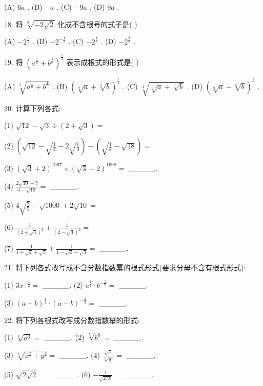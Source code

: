 \documentclass[10pt]{article}
\begin{document}
(A) \({6a}\) . (B) \(- a\) . (C) \(- {9a}\) . (D) \({9a}\) .

18. 将 \(\sqrt[3]{-2\sqrt{2}}\) 化成不含根号的式子是( )

(A) \(- {2}^{\frac{1}{2}}\) . (B) \(- {2}^{-\frac{1}{2}}\) . (C) \(- {2}^{\frac{1}{3}}\) . (D) \(- {2}^{\frac{2}{3}}\) .

19. 将 \({\left( {a}^{\frac{1}{n}} + {b}^{\frac{1}{n}}\right) }^{\frac{1}{3}}\) 表示成根式的形式是( )

(A) \(\sqrt[3]{{a}^{\frac{1}{n}} + {b}^{\frac{1}{n}}}\) . (B) \({\left( \sqrt[n]{a} + \sqrt[n]{b}\right) }^{\frac{1}{3}}\) . (C) \(\sqrt[3]{\sqrt[n]{a} + \sqrt[n]{b}}\) . (D) \({\left( \sqrt[n]{a} + \sqrt[n]{b}\right) }^{3}\) .

20. 计算下列各式:

(1) \(\sqrt{12} - \sqrt{3} \div  \left( {2 + \sqrt{3}}\right)  =\)

(2) \(\left( {\sqrt{12} - \sqrt{\frac{1}{2}} - 2\sqrt{\frac{1}{3}}}\right)  - \left( {\sqrt{\frac{1}{8}} - \sqrt{18}}\right)  =\)

(3) \({\left( \sqrt{3} + 2\right) }^{1997} \times  {\left( \sqrt{3} - 2\right) }^{1998} =\) \_\_\_\_\_.

(4) \(\frac{2\sqrt{10} - 5}{4 - \sqrt{10}} =\) \_\_\_\_\_.

(5) \(4\sqrt{\frac{2}{5}} - \sqrt{1000} + 2\sqrt{10} =\)

(6) \(\frac{1}{{\left( 2 + \sqrt{3}\right) }^{2}} + \frac{1}{{\left( 2 - \sqrt{3}\right) }^{2}} =\)

(7) \(\frac{1}{1 + \sqrt{2} + \sqrt{3}} + \frac{1}{1 - \sqrt{2} + \sqrt{3}} =\) \_\_\_\_\_.

21. 将下列各式改写成不含分数指数幂的根式形式(要求分母不含有根式形式):

(1) \(3{x}^{-\frac{3}{2}} =\) \_\_\_\_\_. (2) \({a}^{\frac{1}{2}} \cdot  {b}^{-\frac{1}{2}} =\) \_\_\_\_\_.

(3) \({\left( a + b\right) }^{\frac{1}{2}} \cdot  {\left( a - b\right) }^{-\frac{4}{3}} =\) \_\_\_\_\_.

22. 将下列各根式改写成分数指数幂的形式:

(1) \(\sqrt[4]{{a}^{3}} =\) \_\_\_\_\_. (2) \(\sqrt[5]{{b}^{8}} =\) \_\_\_\_\_.

(3) \(\sqrt[4]{{x}^{2} + {y}^{2}} =\) \_\_\_\_\_. (4) \(\frac{\sqrt{x}}{\sqrt[3]{{y}^{4}}} =\) \_\_\_\_\_.

(5) \(\sqrt{2\sqrt{2}} =\) \_\_\_\_\_. (6) \(- \frac{1}{\sqrt{27x}} =\) \_\_\_\_\_.
\end{document}
